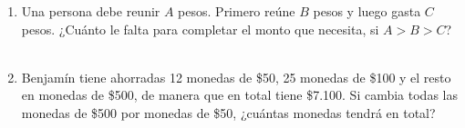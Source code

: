 \documentclass[11pt,letterpaper]{article}
\newenvironment{alternativas}{%
\begin{enumerate}[label=\Alph*), leftmargin=14pt, itemsep=2pt, topsep=2pt]
}{\end{enumerate}}
\begin{document}
\begin{enumerate}[label=\textbf{\arabic*.}, leftmargin=*, itemsep=7pt]
\item
\begin{minipage}[t]{\linewidth}
Una persona debe reunir $A$ pesos. Primero reúne $B$ pesos y luego gasta $C$ pesos. ¿Cuánto le falta para completar el monto que necesita, si $A>B>C$?\\
\\%
\begin{minipage}{\linewidth}
\vspace{7mm}
\end{minipage}
\vspace{7mm}
\end{minipage}

\item
\begin{minipage}[t]{\linewidth}
Benjamín tiene ahorradas 12 monedas de \$50, 25 monedas de \$100 y el resto en monedas de \$500, de manera que en total tiene \$7.100. Si cambia todas las monedas de \$500 por monedas de \$50, ¿cuántas monedas tendrá en total?\\
\\%
\begin{minipage}{\linewidth}
\vspace{7mm}
\end{minipage}
\vspace{7mm}
\end{minipage}


\end{enumerate}
\end{document}
